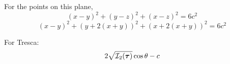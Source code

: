 For the points on this plane,
\[
(x-y)^2 + (y-z)^2 + (x-z)^2 = 6c^2 
\]
\[
(x-y)^2 + (y+2(x+y))^2 + (x+2(x+y))^2 = 6c^2 
\]


For Tresca: 
\[
2\sqrt{ {\cal I}_2({\bm \tau})  } \cos \theta - c 
\]





\newpage
